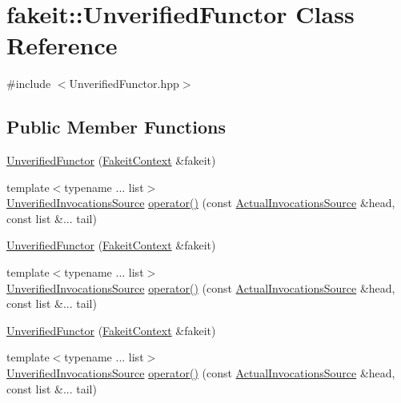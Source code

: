 \hypertarget{classfakeit_1_1UnverifiedFunctor}{}\section{fakeit\+::Unverified\+Functor Class Reference}
\label{classfakeit_1_1UnverifiedFunctor}


{\ttfamily \#include $<$Unverified\+Functor.\+hpp$>$}

\subsection*{Public Member Functions}
\begin{DoxyCompactItemize}
\item 
\mbox{\hyperlink{classfakeit_1_1UnverifiedFunctor_a5dcaec59e8d210db88b5600118e51426}{Unverified\+Functor}} (\mbox{\hyperlink{structfakeit_1_1FakeitContext}{Fakeit\+Context}} \&fakeit)
\item 
{\footnotesize template$<$typename ... list$>$ }\\\mbox{\hyperlink{structfakeit_1_1UnverifiedInvocationsSource}{Unverified\+Invocations\+Source}} \mbox{\hyperlink{classfakeit_1_1UnverifiedFunctor_a460588cf559622fd0b9e9b30c5f7c9c9}{operator()}} (const \mbox{\hyperlink{structfakeit_1_1ActualInvocationsSource}{Actual\+Invocations\+Source}} \&head, const list \&... tail)
\item 
\mbox{\hyperlink{classfakeit_1_1UnverifiedFunctor_a5dcaec59e8d210db88b5600118e51426}{Unverified\+Functor}} (\mbox{\hyperlink{structfakeit_1_1FakeitContext}{Fakeit\+Context}} \&fakeit)
\item 
{\footnotesize template$<$typename ... list$>$ }\\\mbox{\hyperlink{structfakeit_1_1UnverifiedInvocationsSource}{Unverified\+Invocations\+Source}} \mbox{\hyperlink{classfakeit_1_1UnverifiedFunctor_a460588cf559622fd0b9e9b30c5f7c9c9}{operator()}} (const \mbox{\hyperlink{structfakeit_1_1ActualInvocationsSource}{Actual\+Invocations\+Source}} \&head, const list \&... tail)
\item 
\mbox{\hyperlink{classfakeit_1_1UnverifiedFunctor_a5dcaec59e8d210db88b5600118e51426}{Unverified\+Functor}} (\mbox{\hyperlink{structfakeit_1_1FakeitContext}{Fakeit\+Context}} \&fakeit)
\item 
{\footnotesize template$<$typename ... list$>$ }\\\mbox{\hyperlink{structfakeit_1_1UnverifiedInvocationsSource}{Unverified\+Invocations\+Source}} \mbox{\hyperlink{classfakeit_1_1UnverifiedFunctor_a460588cf559622fd0b9e9b30c5f7c9c9}{operator()}} (const \mbox{\hyperlink{structfakeit_1_1ActualInvocationsSource}{Actual\+Invocations\+Source}} \&head, const list \&... tail)

\end{DoxyCompactItemize}
